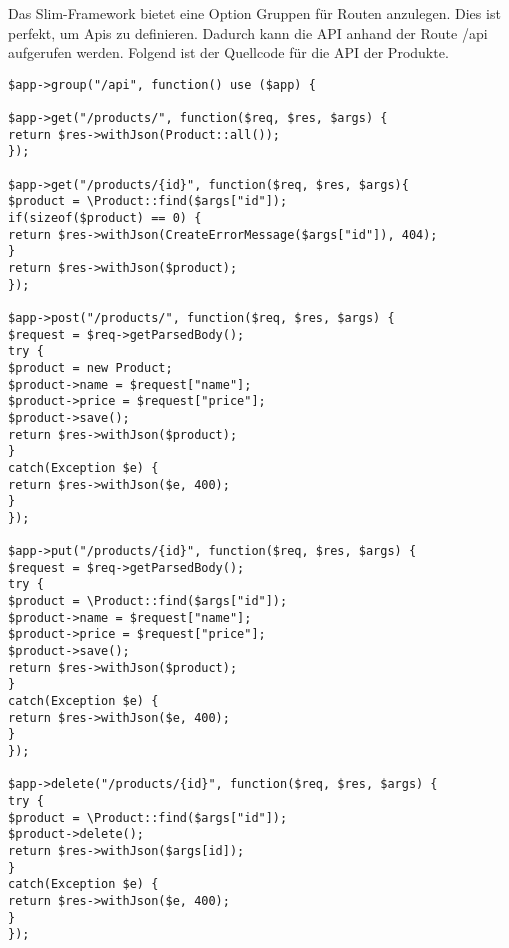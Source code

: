 Das Slim-Framework bietet eine Option Gruppen für Routen anzulegen. Dies ist perfekt, um Apis zu definieren. Dadurch kann die API anhand der Route /api aufgerufen werden. Folgend ist der Quellcode für die API der Produkte.
\lstset{language=PHP} 
\begin{lstlisting}[frame=single]
$app->group("/api", function() use ($app) {  

$app->get("/products/", function($req, $res, $args) {
return $res->withJson(Product::all());
});

$app->get("/products/{id}", function($req, $res, $args){
$product = \Product::find($args["id"]);
if(sizeof($product) == 0) {
return $res->withJson(CreateErrorMessage($args["id"]), 404);
}
return $res->withJson($product);
});

$app->post("/products/", function($req, $res, $args) {
$request = $req->getParsedBody();
try {
$product = new Product;
$product->name = $request["name"];
$product->price = $request["price"];
$product->save();
return $res->withJson($product);
}
catch(Exception $e) {
return $res->withJson($e, 400);
}
});

$app->put("/products/{id}", function($req, $res, $args) {
$request = $req->getParsedBody();
try {
$product = \Product::find($args["id"]);
$product->name = $request["name"];
$product->price = $request["price"];
$product->save();
return $res->withJson($product);
}
catch(Exception $e) {
return $res->withJson($e, 400);
}
});

$app->delete("/products/{id}", function($req, $res, $args) {
try {
$product = \Product::find($args["id"]);
$product->delete();
return $res->withJson($args[id]);
}
catch(Exception $e) {
return $res->withJson($e, 400);
}
});
\end{lstlisting}